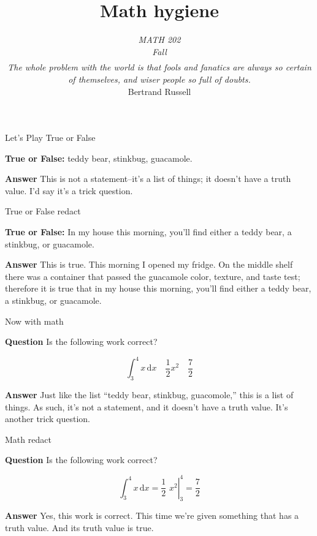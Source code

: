 \documentclass[fleqn]{beamer}
\subtitle{\emph{MATH 202} \\ \emph{Fall \the\year}  \\ $\phantom{xxx}$ \\ 
\emph{The whole problem with the world is that fools and fanatics are 
always so certain of themselves, and wiser people so full of doubts.} \\ \vspace{0.25in} Bertrand Russell}
\title{\textbf{Math hygiene}}
\date{}
\theoremstyle{definition}
\begin{document}
\frame{\titlepage}

\begin{frame}{Let's Play True or False}

    \textbf{True or False:} teddy bear, stinkbug, guacamole.

    \vspace{0.5in}
    \textbf{Answer} This is not a statement--it's a list of things; it doesn't 
    have a truth value. I'd say it's a trick question.

\vfill 
\end{frame}

\begin{frame}{True or False redact}

  \textbf{True or False:} In my house this morning, you'll 
  find either a teddy bear, a stinkbug, or guacamole.

  \vspace{0.5in}
  \textbf{Answer} This is true. This morning I opened my fridge. On the
  middle shelf there was a container that passed the guacamole color,
  texture, and taste test; therefore it is true that in my house this morning, you'll 
  find either a teddy bear, a stinkbug, or guacamole.

\vfill 
\end{frame}

\begin{frame}{Now with math}

  \textbf{Question} Is the following work correct?

  \begin{equation*}
    \int_3^4 x \, \mathrm{d}x \quad 
     \frac{1}{2} x^{2} \quad \frac{7}{2}
  \end{equation*}

  \vspace{0.5in}
  \textbf{Answer} Just like the list ``teddy bear, stinkbug, 
  guacomole,''
  this is a list of things. As such, it's not 
  a statement, and it doesn't have a truth value. It's another trick 
  question.
  \vfill 
\end{frame}

\begin{frame}{Math redact}

  \textbf{Question} Is the following work correct?

  \begin{equation*}
    \int_3^4 x \, \mathrm{d}x =
     \left. \frac{1}{2} \,\, x^{2} \right |_{3}^4 = \frac{7}{2}
  \end{equation*}

  \vspace{0.5in}
  \textbf{Answer} Yes, this work is correct. This time we're 
  given something that has a truth value. And its truth value is
  true.

  \vfill
\end{frame}
\end{document}

